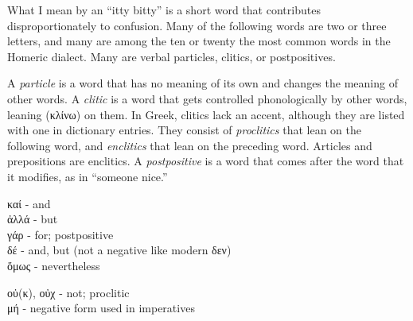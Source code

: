 \begin{small}
\pagebreak


What I mean by an ``itty bitty'' is a short word that contributes disproportionately to confusion.
Many of the following words are two or three letters, and many are among the ten or twenty the most common
words in the Homeric dialect. Many are verbal particles, clitics, or postpositives.

A \emph{particle} is a word that has no meaning of its own and changes the meaning of other words.
A \emph{clitic} is a word that gets controlled phonologically by other words, leaning (κλίνω) on them. In Greek,
clitics lack an accent, although they are listed with one in dictionary entries. 
They consist of \emph{proclitics} that lean on the following word, and
\emph{enclitics} that lean on the preceding word. Articles and prepositions are enclitics.
A \emph{postpositive} is a word that comes after the word that it modifies, as in ``someone nice.''




καί - and\\
ἀλλά - but\\
γάρ - for; postpositive\\
δέ - and, but (not a negative like modern δεν)\\
ὅμως - nevertheless\\


οὐ(κ), οὐχ - not; proclitic\\
μή - negative form used in imperatives\\




\end{small}
